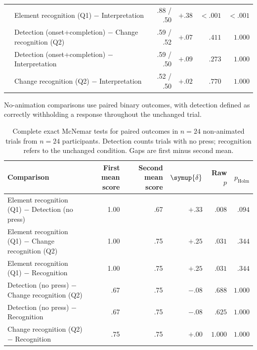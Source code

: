 \documentclass[
english,                 %
bibtex,                  %
includeExtraAbstracts, %
]{kththesis}
\newenvironment{evidenceblock}{\par\addvspace{6pt}\noindent\begin{minipage}{\linewidth}}{\end{minipage}\par\addvspace{6pt}}
\numberwithin{listing}{chapter}
\begin{document}
\begin{evidenceblock}
\begin{table}[H]
\begin{tabularx}{\textwidth}{@{}l >{\raggedright\arraybackslash}X r r r r@{}}
 & Element recognition (Q1) $-$ Interpretation & .88 / .50 & $+.38$ & $< .001$ & $< .001$ \\

 & Detection (onset+completion) $-$ Change recognition (Q2) & .59 / .52 & $+.07$ & $.411$ & $1.000$ \\

 & Detection (onset+completion) $-$ Interpretation & .59 / .50 & $+.09$ & $.273$ & $1.000$ \\

 & Change recognition (Q2) $-$ Interpretation & .52 / .50 & $+.02$ & $.770$ & $1.000$ \\
\bottomrule
\end{tabularx}
\end{table}
\end{evidenceblock}

\begin{evidenceblock}
\normalsize
No-animation comparisons use paired binary outcomes, with detection defined as correctly withholding a response throughout the unchanged trial.

\begin{table}[H]
\centering
\caption[Paired outcomes in no-animation trials]{Complete exact McNemar tests for paired outcomes in $n = 24$ non-animated trials from $n = 24$ participants. Detection counts trials with no press; recognition refers to the unchanged condition. Gaps are first minus second mean.}
\label{tab:cross-rq-mcnemar}
\scriptsize
\setlength{\tabcolsep}{3pt}
\renewcommand{\arraystretch}{1.1}
\begin{tabularx}{\textwidth}{@{}>{\raggedright\arraybackslash}X r r r r r@{}}
\toprule
Comparison & First mean score & Second mean score & \multicolumn{1}{c}{$\symup{\delta}$} & Raw $p$ & $p_{\mathrm{Holm}}$ \\
\midrule
Element recognition (Q1) $-$ Detection (no press) & 1.00 & .67 & $+.33$ & $.008$ & $.094$ \\

Element recognition (Q1) $-$ Change recognition (Q2) & 1.00 & .75 & $+.25$ & $.031$ & $.344$ \\

Element recognition (Q1) $-$ Recognition & 1.00 & .75 & $+.25$ & $.031$ & $.344$ \\

Detection (no press) $-$ Change recognition (Q2) & .67 & .75 & $-.08$ & $.688$ & $1.000$ \\

Detection (no press) $-$ Recognition & .67 & .75 & $-.08$ & $.625$ & $1.000$ \\

Change recognition (Q2) $-$ Recognition & .75 & .75 & $+.00$ & $1.000$ & $1.000$ \\
\bottomrule
\end{tabularx}
\end{table}
\end{evidenceblock}
\end{document}
